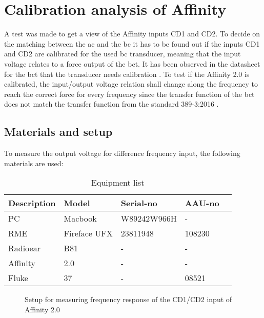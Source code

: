 \chapter{Calibration analysis of Affinity}
\label{append:affinity_bc_calibration}
A test was made to get a view of the Affinity inputs CD1 and CD2. To decide on the matching between the \gls{ac} and the \gls{bc} it has to be found out if the inputs CD1 and CD2 are calibrated for the used \gls{bc} transducer, meaning that the input voltage relates to a force output of the \gls{bct}. It has been observed in the datasheet for the \gls{bct} that the transducer needs calibration \citep{radioear_b81}. To test if the Affinity 2.0 is calibrated, the input/output voltage relation shall change along the frequency to reach the correct force for every frequency since the transfer function of the \gls{bct} does not match the transfer function from the standard 389-3:2016 \citep{iso_389-3}.

\section*{Materials and setup}
To measure the output voltage for difference frequency input, the following materials are used:

\begin{table}[H]
\centering
\caption{Equipment list}
\begin{tabular}{l|l|l|l l}
Description         	& Model                                        & Serial-no  						& AAU-no \\ \hline
PC        			 		& Macbook                                   & W89242W966H  			& -  \\
RME  					& Fireface UFX                             &  23811948 			 	& 108230 \\
Radioear   				&  B81                            & -   									& - \\
Affinity     				& 2.0                            				& -   									& -  \\
Fluke    				& 37                           				& -   									& 08521  
\end{tabular}
\end{table}



\begin{figure}[H]
\centering
\def\svgwidth{\columnwidth}

\caption{Setup for measuring frequency response of the CD1/CD2 input of Affinity 2.0}
		\label{fig:appendix:test_cal_affinity}
\end{figure}

